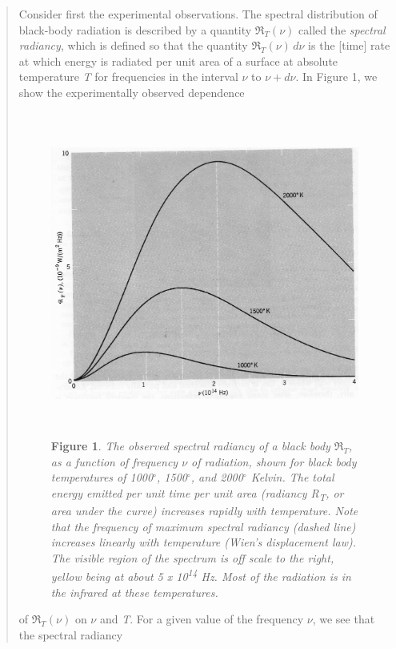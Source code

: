 \begin{quotation}
Consider first the experimental observations. The spectral distribution
of black-body radiation is described by a quantity
$\Re_T(\nu)$ called the \emph{spectral radiancy}, which
is defined so that the quantity $\Re_T(\nu)\,d\nu$ is the
{[}time{]} rate at which energy is radiated per unit area of a surface
at absolute temperature \emph{T} for frequencies in the interval
$\nu$ to $\nu\! +\! d\nu$. In Figure 1, we show the experimentally
observed dependence
%
\begin{figure}[h]
  \begin{center}
  \captionsetup{width=.8\linewidth}
  \includegraphics[width=5.125in,height=4.19792in]{images/05_planck/image001.jpg}
  \caption*{\textbf{Figure 1}. \emph{The observed spectral radiancy of a black body
  $\Re_T$, as a function of frequency $\nu$ of
  radiation, shown for black body temperatures of 1000$^\circ$, 1500$^\circ$, and 2000$^\circ$
  Kelvin. The total energy emitted per unit time per unit area (radiancy
  \emph{R\textsubscript{T}}, or area under the curve) increases rapidly
  with temperature. Note that the frequency of maximum spectral radiancy
  (dashed line) increases linearly with temperature (Wien's displacement
  law). The visible region of the spectrum is off scale to the right,
  yellow being at about 5 x 10\textsuperscript{14} Hz. Most of the
  radiation is in the infrared at these temperatures.}}
  \end{center}
\end{figure}
%
of $\Re_T(\nu)$ on $\nu$ and \emph{T}. For a given
value of the frequency $\nu$, we see that the spectral radiancy

\end{quotation}
